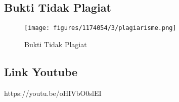 \subsection{Bukti Tidak Plagiat}
\begin{figure}[H]
	\texttt{[image: figures/1174054/3/plagiarisme.png]}
	\centering
	\caption{Bukti Tidak Plagiat}
\end{figure}

\subsection{Link Youtube}
https://youtu.be/oHIVbO0slEI